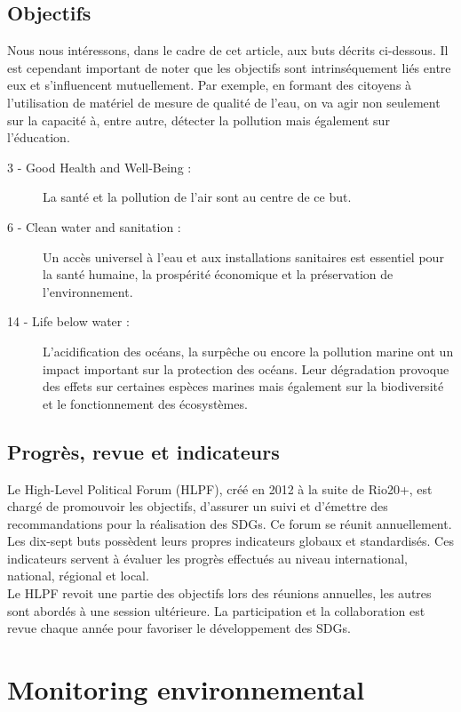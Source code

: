 \documentclass[10pt, conference, compsocconf]{llncs}
\begin{document}
		\subsection{Objectifs}
			Nous nous intéressons, dans le cadre de cet article, aux buts décrits ci-dessous. Il est cependant important de noter que les objectifs sont intrinséquement liés entre eux et s'influencent mutuellement. Par exemple, en formant des citoyens à l'utilisation de matériel de mesure de qualité de l'eau, on va agir non seulement sur la capacité à, entre autre, détecter la pollution mais également sur l'éducation.
			\begin{description}
				\item[ 3 - Good Health and Well-Being :] La santé et la pollution de l'air sont au centre de ce but.
				\item[ 6 - Clean water and sanitation :] Un accès universel à l'eau et aux installations sanitaires est essentiel pour la santé humaine, la prospérité économique et la préservation de l'environnement.
				\item[14 - Life below water :] L'acidification des océans, la surpêche ou encore la pollution marine ont un impact important sur la protection des océans. Leur dégradation provoque des effets sur certaines espèces marines mais également sur la biodiversité et le fonctionnement des écosystèmes.
			\end{description}				
		
		\subsection{Progrès, revue et indicateurs}
			Le High-Level Political Forum (HLPF), créé en 2012 à la suite de Rio20+, est chargé de promouvoir les objectifs, d'assurer un suivi et d'émettre des recommandations pour la réalisation des SDGs. Ce forum se réunit annuellement. \\
			Les dix-sept buts possèdent leurs propres indicateurs globaux et standardisés. Ces indicateurs servent à évaluer les progrès effectués au niveau international, national, régional et local. \\
			Le HLPF revoit une partie des objectifs lors des réunions annuelles, les autres sont abordés à une session ultérieure. La participation et la collaboration est revue chaque année pour favoriser le développement des SDGs.

\section{Monitoring environnemental}
\end{document}
